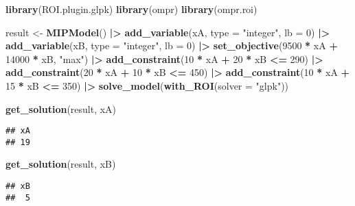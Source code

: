 \documentclass[
]{article}
\newenvironment{Shaded}{\begin{snugshade}}{\end{snugshade}}
\newcommand{\AttributeTok}[1]{\textcolor[rgb]{0.13,0.29,0.53}{#1}}
\newcommand{\DecValTok}[1]{\textcolor[rgb]{0.00,0.00,0.81}{#1}}
\newcommand{\FunctionTok}[1]{\textcolor[rgb]{0.13,0.29,0.53}{\textbf{#1}}}
\newcommand{\NormalTok}[1]{#1}
\newcommand{\OtherTok}[1]{\textcolor[rgb]{0.56,0.35,0.01}{#1}}
\newcommand{\SpecialCharTok}[1]{\textcolor[rgb]{0.81,0.36,0.00}{\textbf{#1}}}
\newcommand{\StringTok}[1]{\textcolor[rgb]{0.31,0.60,0.02}{#1}}
\begin{document}
\begin{Shaded}
\begin{Highlighting}[]
\FunctionTok{library}\NormalTok{(ROI.plugin.glpk)}
\FunctionTok{library}\NormalTok{(ompr)}
\FunctionTok{library}\NormalTok{(ompr.roi)}

\NormalTok{result }\OtherTok{\textless{}{-}} \FunctionTok{MIPModel}\NormalTok{() }\SpecialCharTok{|\textgreater{}}
  \FunctionTok{add\_variable}\NormalTok{(xA, }\AttributeTok{type =} \StringTok{"integer"}\NormalTok{, }\AttributeTok{lb =} \DecValTok{0}\NormalTok{) }\SpecialCharTok{|\textgreater{}}
  \FunctionTok{add\_variable}\NormalTok{(xB, }\AttributeTok{type =} \StringTok{"integer"}\NormalTok{, }\AttributeTok{lb =} \DecValTok{0}\NormalTok{) }\SpecialCharTok{|\textgreater{}}
  \FunctionTok{set\_objective}\NormalTok{(}\DecValTok{9500} \SpecialCharTok{*}\NormalTok{ xA }\SpecialCharTok{+} \DecValTok{14000} \SpecialCharTok{*}\NormalTok{ xB, }\StringTok{"max"}\NormalTok{) }\SpecialCharTok{|\textgreater{}}
  \FunctionTok{add\_constraint}\NormalTok{(}\DecValTok{10} \SpecialCharTok{*}\NormalTok{ xA }\SpecialCharTok{+} \DecValTok{20} \SpecialCharTok{*}\NormalTok{ xB }\SpecialCharTok{\textless{}=} \DecValTok{290}\NormalTok{) }\SpecialCharTok{|\textgreater{}}
  \FunctionTok{add\_constraint}\NormalTok{(}\DecValTok{20} \SpecialCharTok{*}\NormalTok{ xA }\SpecialCharTok{+} \DecValTok{10} \SpecialCharTok{*}\NormalTok{ xB }\SpecialCharTok{\textless{}=} \DecValTok{450}\NormalTok{) }\SpecialCharTok{|\textgreater{}}
  \FunctionTok{add\_constraint}\NormalTok{(}\DecValTok{10} \SpecialCharTok{*}\NormalTok{ xA }\SpecialCharTok{+} \DecValTok{15} \SpecialCharTok{*}\NormalTok{ xB }\SpecialCharTok{\textless{}=} \DecValTok{350}\NormalTok{) }\SpecialCharTok{|\textgreater{}}
  \FunctionTok{solve\_model}\NormalTok{(}\FunctionTok{with\_ROI}\NormalTok{(}\AttributeTok{solver =} \StringTok{"glpk"}\NormalTok{))}

\FunctionTok{get\_solution}\NormalTok{(result, xA)}
\end{Highlighting}
\end{Shaded}

\begin{verbatim}
## xA 
## 19
\end{verbatim}

\begin{Shaded}
\begin{Highlighting}[]
\FunctionTok{get\_solution}\NormalTok{(result, xB)}
\end{Highlighting}
\end{Shaded}

\begin{verbatim}
## xB 
##  5
\end{verbatim}
\end{document}
